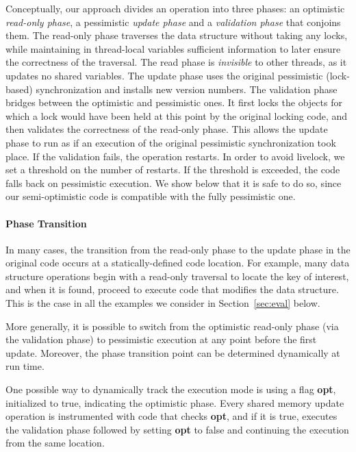 Conceptually, our approach divides an operation into three phases: an optimistic \emph{read-only phase},
a pessimistic \emph{update phase} and a \emph{validation phase} that conjoins them.
The read-only phase traverses the data structure without taking any locks, while maintaining 
in thread-local variables
sufficient information to later ensure the correctness of the traversal.
The read phase is \emph{invisible} to other threads, as it updates no shared variables.
The update phase uses the original pessimistic (lock-based) synchronization and installs new version numbers.
The validation phase bridges between the optimistic and pessimistic ones.
It first locks the objects for which a lock would have been held at this point by
the original locking code, and then validates the correctness
of the read-only phase. This allows the
update phase to run as if an execution of the original pessimistic synchronization
took place. If the validation fails, the operation
restarts. In order to avoid livelock, we set a threshold on the number of restarts.
If the threshold is exceeded, the code falls back on pessimistic execution.
We show below that
it is safe to do so, since our semi-optimistic code is compatible
with the fully pessimistic one.


\paragraph{Phase Transition}
In many cases, the transition from the read-only phase to the update phase in the original code occurs at a statically-defined code location. For example, many data structure operations begin with a read-only traversal to locate the key of interest, and when it is found, proceed to execute code that modifies the data structure. This is the case in all the examples we consider in Section~\ref{sec:eval} below.

More generally, it is possible to switch from the optimistic read-only phase (via the validation phase) to pessimistic execution at any point before the first update. Moreover, the phase transition point can be determined dynamically at run time.

One possible way to dynamically track the execution mode is using a flag \textbf{opt}, initialized to true, indicating the optimistic phase. 
Every shared memory update operation is instrumented with code that checks \textbf{opt}, and if it is true, executes the validation phase followed by setting \textbf{opt} to false and continuing the execution from the same location. 

